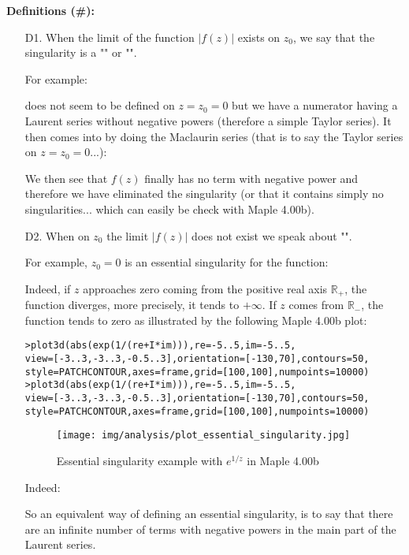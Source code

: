 	\textbf{Definitions (\#\mydef):}
	\begin{enumerate}
		\item[D1.] When the limit of the function $\vert f(z) \vert$ exists on $z_0$, we say that the singularity is a "" or "".
		
		For example:
		
		does not seem to be defined on $z=z_0=0$ but we have a numerator having a Laurent series without negative powers (therefore a simple Taylor series). It then comes into by doing the Maclaurin series (that is to say the Taylor series on $z=z_0=0$...):
		
		We then see that $f (z)$ finally has no term with negative power and therefore we have eliminated the singularity (or that it contains simply no singularities... which can easily be check with Maple 4.00b).
		
		\item[D2.] When on $z_0$ the limit $\vert f(z) \vert $ does not exist we speak about "".
		
		For example, $z_0=0$ is an essential singularity for the function:
		
		Indeed, if $z$ approaches zero coming from the positive real axis $\mathbb{R}_+$, the function diverges, more precisely, it tends to $+\infty$. If $z$ comes from $\mathbb{R}_-$, the function tends to zero as illustrated by the following Maple 4.00b plot:
		
		
		\texttt{>plot3d(abs(exp(1/(re+I*im))),re=-5..5,im=-5..5,\\
		view=[-3..3,-3..3,-0.5..3],orientation=[-130,70],contours=50,\\
		style=PATCHCONTOUR,axes=frame,grid=[100,100],numpoints=10000)\\
		>plot3d(abs(exp(1/(re+I*im))),re=-5..5,im=-5..5,\\
		view=[-3..3,-3..3,-0.5..3],orientation=[-130,70],contours=50,\\
		style=PATCHCONTOUR,axes=frame,grid=[100,100],numpoints=10000)}
		\begin{figure}[H]
			\centering
			\texttt{[image: img/analysis/plot\_essential\_singularity.jpg]}
			\caption{Essential singularity example with $e^{1/z}$ in Maple 4.00b}
		\end{figure}
		Indeed:
		
		So an equivalent way of defining an essential singularity, is to say that there are an infinite number of terms with negative powers in the main part of the Laurent series.
		

\end{enumerate}
